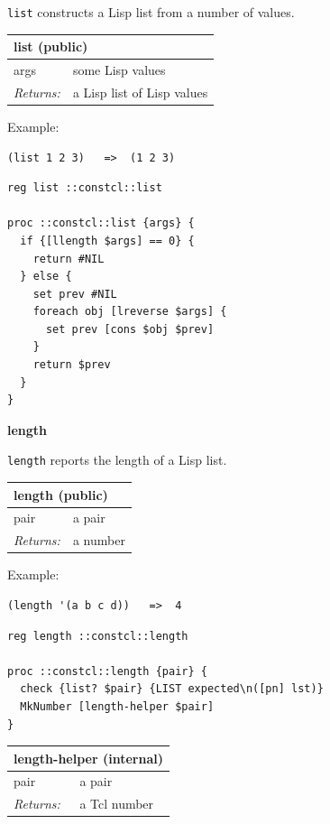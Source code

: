 \documentclass[twoside,9pt]{report}
\begin{document}
\texttt{list} constructs a Lisp list from a number of values.

\begin{tabular}{ |l l| }
\hline
\multicolumn{2}{|l|}{list (public)} \\
\hline
args & some Lisp values \\
\textit{Returns:} & a Lisp list of Lisp values \\
\hline
\end{tabular}


Example:

\noindent\makebox[\linewidth]{\rule{\linewidth}{0.4pt}}
\begin{lstlisting}
(list 1 2 3)   =>  (1 2 3)
\end{lstlisting}
\noindent\makebox[\linewidth]{\rule{\linewidth}{0.4pt}}
\noindent\makebox[\linewidth]{\rule{\linewidth}{0.4pt}}
\begin{lstlisting}
reg list ::constcl::list
 
proc ::constcl::list {args} {
  if {[llength $args] == 0} {
    return #NIL
  } else {
    set prev #NIL
    foreach obj [lreverse $args] {
      set prev [cons $obj $prev]
    }
    return $prev
  }
}
\end{lstlisting}
\noindent\makebox[\linewidth]{\rule{\linewidth}{0.4pt}}

\textbf{length}


\texttt{length} reports the length of a Lisp list.

\begin{tabular}{ |l l| }
\hline
\multicolumn{2}{|l|}{length (public)} \\
\hline
pair & a pair \\
\textit{Returns:} & a number \\
\hline
\end{tabular}


Example:

\noindent\makebox[\linewidth]{\rule{\linewidth}{0.4pt}}
\begin{lstlisting}
(length '(a b c d))   =>  4
\end{lstlisting}
\noindent\makebox[\linewidth]{\rule{\linewidth}{0.4pt}}
\noindent\makebox[\linewidth]{\rule{\linewidth}{0.4pt}}
\begin{lstlisting}
reg length ::constcl::length
 
proc ::constcl::length {pair} {
  check {list? $pair} {LIST expected\n([pn] lst)}
  MkNumber [length-helper $pair]
}
\end{lstlisting}
\noindent\makebox[\linewidth]{\rule{\linewidth}{0.4pt}}
\begin{tabular}{ |l l| }
\hline
\multicolumn{2}{|l|}{length-helper (internal)} \\
\hline
pair & a pair \\
\textit{Returns:} & a Tcl number \\
\hline
\end{tabular}
\end{document}
